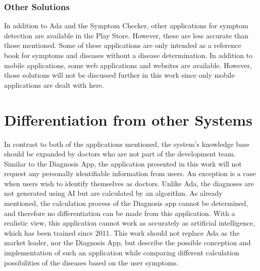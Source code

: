 \subsubsection{Other Solutions}
In addition to Ada and the Symptom Checker, other applications for symptom detection are available in the Play Store. However, these are less accurate than those mentioned. Some of these applications are only intended as a reference book for symptoms and diseases without a disease determination. In addition to mobile applications, some web applications and websites are available. However, those solutions will not be discussed further in this work since only mobile applications are dealt with here.

\section{Differentiation from other Systems}
In contrast to both of the applications mentioned, the system's knowledge base should be expanded by doctors who are not part of the development team. Similar to the Diagnosis App, the application presented in this work will not request any personally identifiable information from users. An exception is a case when users wish to identify themselves as doctors. Unlike Ada, the diagnoses are not generated using AI but are calculated by an algorithm. As already mentioned, the calculation process of the Diagnosis app cannot be determined, and therefore no differentiation can be made from this application. With a realistic view, this application cannot work as accurately as artificial intelligence, which has been trained since 2011. This work should not replace Ada as the market leader, nor the Diagnosis App, but describe the possible conception and implementation of such an application while comparing different calculation possibilities of the diseases based on the user symptoms.




